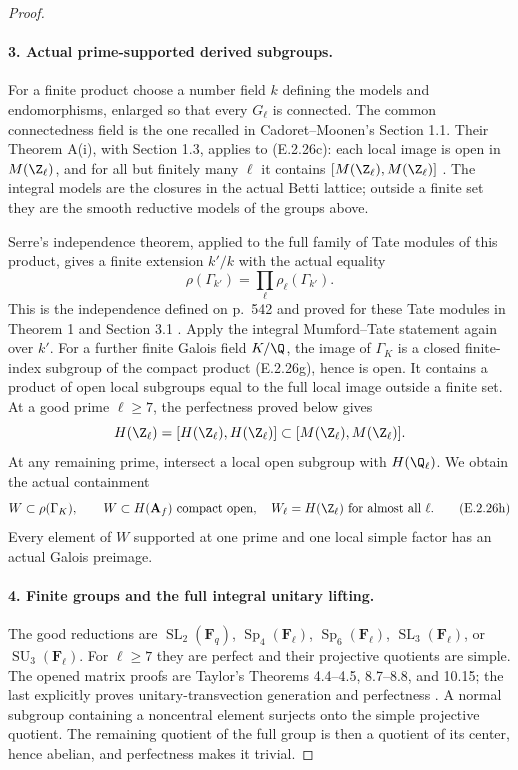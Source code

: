 \begin{proof}
\paragraph{3. Actual prime-supported derived subgroups.}
For a finite product choose a number field \(k\) defining
the models and endomorphisms, enlarged so that every
\(G_\ell\) is connected. The common connectedness field is
the one recalled in Cadoret--Moonen's Section 1.1.
Their Theorem A(i), with Section 1.3, applies to (E.2.26c):
each local image is open in \(M(\Z_\ell)\), and for all
but finitely many \(\ell\) it contains
\([M(\Z_\ell),M(\Z_\ell)]\)
\cite[Theorem A(i), Sections 1.1--1.3]{GenCadoretMoonen2020}.
The integral models are the closures in the actual Betti
lattice; outside a finite set they are the smooth reductive
models of the groups above.

Serre's independence theorem, applied to the full family of
Tate modules of this product, gives a finite extension \(k'/k\)
with the actual equality
\[
 \rho(\Gamma_{k'})=\prod_\ell\rho_\ell(\Gamma_{k'}).
 \tag{E.2.26g}
\]
This is the independence defined on p.~542 and proved for
these Tate modules in Theorem 1 and Section 3.1
\cite[pp.~542--545]{GenSerreIndependence2013}.
Apply the integral Mumford--Tate statement again over \(k'\).
For a further finite Galois field \(K/\Q\), the image of
\(\Gamma_K\) is a closed finite-index subgroup of the compact
product (E.2.26g), hence is open. It contains a product of open
local subgroups equal to the full local image outside a finite
set. At a good prime \(\ell\geq7\), the perfectness proved
below gives
\[
 H(\Z_\ell)=[H(\Z_\ell),H(\Z_\ell)]
       \subset[M(\Z_\ell),M(\Z_\ell)].
\]
At any remaining prime, intersect a local open subgroup with
\(H(\Q_\ell)\). We obtain the actual containment
\[
 W\subset\rho(\Gamma_K),\qquad
 W\subset H(\mathbf A_f)\text{ compact open},
 \quad W_\ell=H(\Z_\ell)\text{ for almost all }\ell.
 \tag{E.2.26h}
\]
Every element of \(W\) supported at one prime and one local
simple factor has an actual Galois preimage.

\paragraph{4. Finite groups and the full integral unitary lifting.}
The good reductions are
\(\operatorname{SL}_2(\mathbf F_q)\),
\(\operatorname{Sp}_4(\mathbf F_\ell)\),
\(\operatorname{Sp}_6(\mathbf F_\ell)\),
\(\operatorname{SL}_3(\mathbf F_\ell)\), or
\(\operatorname{SU}_3(\mathbf F_\ell)\).
For \(\ell\geq7\) they are perfect and their projective
quotients are simple. The opened matrix proofs are Taylor's
Theorems 4.4--4.5, 8.7--8.8, and 10.15; the last explicitly
proves unitary-transvection generation and perfectness
\cite[pp.~22--23, 72--74, 122--123]{GenTaylorClassical2021}.
A normal subgroup containing a noncentral element surjects
onto the simple projective quotient. The remaining quotient
of the full group is then a quotient of its center, hence
abelian, and perfectness makes it trivial.


\end{proof}

